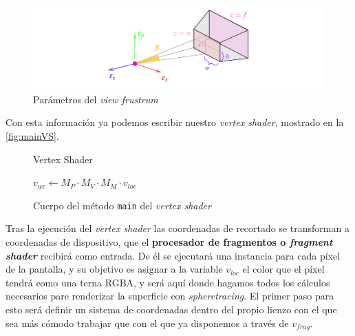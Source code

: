 \begin{itemize}
\end{itemize}

\begin{figure}[ht!]
    \centering
    \includegraphics[width=\textwidth]{Plantilla-TFG-master/img/frustrum.png}
    \caption{Parámetros del \textit{view frustrum}}
\end{figure}

Con esta información ya podemos escribir nuestro \textit{vertex shader}, mostrado en la \autoref{fig:mainVS}.  
\begin{figure}[ht!]
    \centering
       \begin{algorithm}[H]
            \caption{Vertex Shader}
                $v_{wc} \gets M_P \cdot M_V \cdot M_M \cdot v_{loc}$
        \end{algorithm}
    \caption{Cuerpo del método \texttt{main} del \textit{vertex shader}}
    \label{fig:mainVS}
\end{figure}

Tras la ejecución del \textit{vertex shader} las coordenadas de recortado se transforman a coordenadas de dispositivo, que el \textbf{procesador de fragmentos o \textit{fragment shader}} recibirá como entrada. De él se ejecutará una instancia para cada píxel de la pantalla, y su objetivo es asignar a la variable $v_{loc}$ el color que el píxel tendrá como una terna RGBA, y será aquí donde hagamos todos los cálculos necesarios pare renderizar la superficie con \textit{spheretracing}. El primer paso para esto será definir un sistema de coordenadas dentro del propio lienzo con el que sea más cómodo trabajar que con el que ya disponemos a través de $v_{frag}$.\newline

